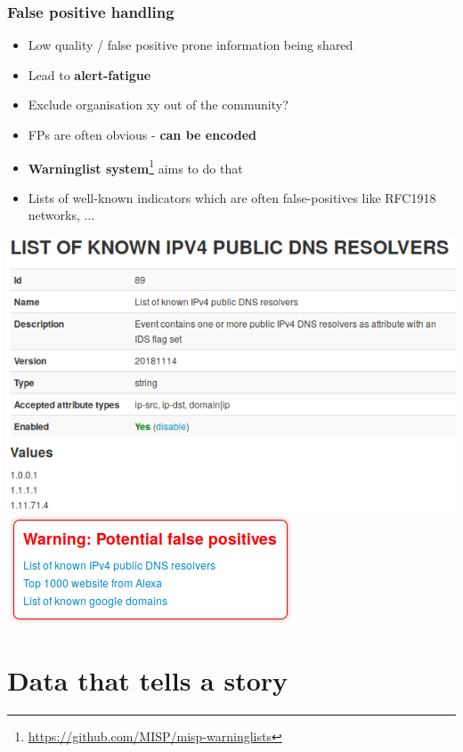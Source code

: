 \begin{frame}
\frametitle{False positive handling}
\begin{itemize}
        \item Low quality / false positive prone information being shared
        \item Lead to {\bf alert-fatigue}
        \item Exclude organisation xy out of the community?
        \item FPs are often obvious - {\bf can be encoded}
        \item {\bf Warninglist system}\footnote{\url{https://github.com/MISP/misp-warninglists}} aims to do that
        \item Lists of well-known indicators which are often false-positives like RFC1918 networks, ...
\end{itemize}
\begin{center}
    \includegraphics[scale=0.22]{warning-list.png}
    \includegraphics[scale=0.45]{warning-list-event.png}
\end{center}
\end{frame}

\section{Data that tells a story}

